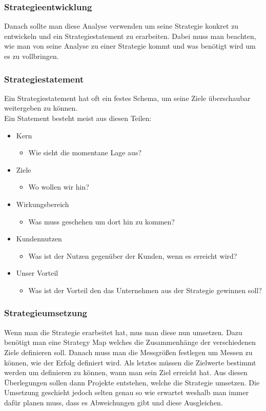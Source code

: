 \documentclass{article}
\begin{document}
  \subsubsection{Strategieentwicklung}
  Danach sollte man diese Analyse verwenden um seine Strategie konkret zu entwickeln und ein Strategiestatement zu erarbeiten. Dabei muss man beachten, wie man von seine Analyse zu einer Strategie kommt und was benötigt wird um es zu vollbringen.
  \subsubsection{Strategiestatement}
  Ein Strategiestatement hat oft ein festes Schema, um seine Ziele überschaubar weitergeben zu können. \\
  Ein Statement besteht meist aus diesen Teilen:
  \begin{itemize}
    \item{Kern}
    \begin{itemize}
      \item{Wie sieht die momentane Lage aus?}
    \end{itemize}
    \item{Ziele}
    \begin{itemize}
      \item{Wo wollen wir hin?}
    \end{itemize}
    \item{Wirkungsbereich}
    \begin{itemize}
      \item{Was muss geschehen um dort hin zu kommen?}
    \end{itemize}
    \item{Kundennutzen}
    \begin{itemize}
      \item{Was ist der Nutzen gegenüber der Kunden, wenn es erreicht wird?}
    \end{itemize}
    \item{Unser Vorteil}
    \begin{itemize}
      \item{Was ist der Vorteil den das Unternehmen aus der Strategie gewinnen soll?}
    \end{itemize}
  \end{itemize}
  \subsubsection{Strategieumsetzung}
  Wenn man die Strategie erarbeitet hat, mus man diese nun umsetzen. Dazu benötigt man eine Strategy Map welches die Zusammenhänge der verschiedenen Ziele definieren soll. Danach muss man die Messgrößen festlegen um Messen zu können, wie der Erfolg definiert wird. Als letztes müssen die Zielwerte bestimmt werden um definieren zu können, wann man sein Ziel erreicht hat. Aus diesen Überlegungen sollen dann Projekte entstehen, welche die Strategie umsetzen. Die Umsetzung geschieht jedoch selten genau so wie erwartet weshalb man immer dafür planen muss, dass es Abweichungen gibt und diese Ausgleichen.
\end{document}
